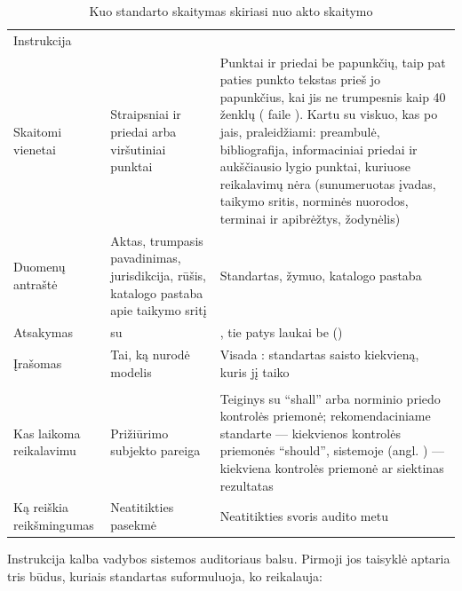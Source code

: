\begin{table}[H]
\caption{Kuo standarto skaitymas skiriasi nuo akto skaitymo}\label{tab:obligations:kinds}
\begin{tabularx}{\textwidth}{@{}L{30mm}YY@{}}
\toprule
 &  &  \\
\midrule
Instrukcija &  &  \\
Skaitomi vienetai & Straipsniai ir priedai arba viršutiniai punktai & Punktai ir priedai be papunkčių, taip pat paties punkto tekstas prieš jo papunkčius, kai jis ne trumpesnis kaip 40 ženklų ( faile ). Kartu su viskuo, kas po jais, praleidžiami: preambulė, bibliografija, informaciniai priedai ir aukščiausio lygio punktai, kuriuose reikalavimų nėra (sunumeruotas įvadas, taikymo sritis, norminės nuorodos, terminai ir apibrėžtys, žodynėlis) \\
Duomenų antraštė & Aktas, trumpasis pavadinimas, jurisdikcija, rūšis, katalogo pastaba apie taikymo sritį & Standartas, žymuo, katalogo pastaba \\
Atsakymas &  su  & , tie patys laukai be  () \\
Įrašomas  & Tai, ką nurodė modelis & Visada : standartas saisto kiekvieną, kuris jį taiko \\
 &  &  \\
Kas laikoma reikalavimu & Prižiūrimo subjekto pareiga & Teiginys su \enquote{shall} arba norminio priedo kontrolės priemonė; rekomendaciniame standarte --- kiekvienos kontrolės priemonės \enquote{should}, sistemoje (angl. ) --- kiekviena kontrolės priemonė ar siektinas rezultatas \\
Ką reiškia reikšmingumas & Neatitikties pasekmė & Neatitikties svoris audito metu \\
\bottomrule
\end{tabularx}
\end{table}

Instrukcija kalba vadybos sistemos auditoriaus balsu. Pirmoji jos taisyklė aptaria tris būdus,
kuriais standartas suformuluoja, ko reikalauja:

